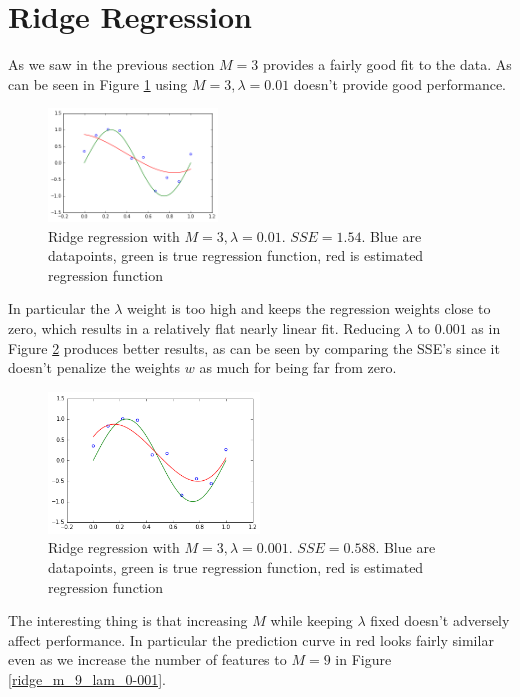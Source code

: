 \documentclass{article}
\begin{document}

\section{Ridge Regression}
As we saw in the previous section $M = 3$ provides a fairly good fit to the data. As can be seen in Figure \ref{ridge_m_3_lam_0-01} using $M = 3, \lambda = 0.01$ doesn't provide good performance.

\begin{figure}[h]
\centering
\includegraphics[width=0.4\textwidth]{m_3_lam_0-01}
\caption{Ridge regression with $M = 3, \lambda = 0.01$. $SSE = 1.54$. Blue are datapoints, green is true regression function, red is estimated regression function}
\label{ridge_m_3_lam_0-01}
\end{figure} 
In particular the $\lambda$ weight is too high and keeps the regression weights close to zero, which results in a relatively flat nearly linear fit. Reducing $\lambda $ to $0.001$ as in Figure \ref{ridge_m_3_lam_0-001} produces better results, as can be seen by comparing the SSE's since it doesn't penalize the weights $w$ as much for being far from zero.
%
\begin{figure}[h]
\centering
\includegraphics[width=0.5\textwidth]{m_3_lam_0-001}
\caption{Ridge regression with $M = 3, \lambda = 0.001$. $SSE = 0.588$. Blue are datapoints, green is true regression function, red is estimated regression function}
\label{ridge_m_3_lam_0-001}
\end{figure}
%
The interesting thing is that increasing $M$ while keeping $\lambda$ fixed doesn't adversely affect performance. In particular the prediction curve in red looks fairly similar even as we increase the number of features to $M = 9$ in Figure \ref{ridge_m_9_lam_0-001}. 
\end{document}
